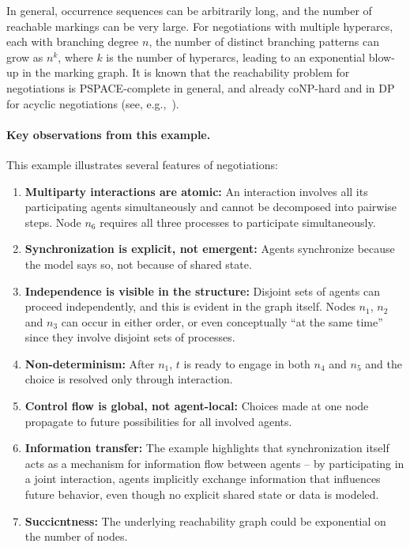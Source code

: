 In general, occurrence sequences can be arbitrarily long, and the number of reachable markings can be very large. For negotiations with multiple hyperarcs, each with branching degree \(n\), the number of distinct branching patterns can grow as \(n^k\), where \(k\) is the number of hyperarcs, leading to an exponential blow-up in the marking graph. It is known that the reachability problem for negotiations is PSPACE-complete in general, and already coNP-hard and in DP for acyclic negotiations (see, e.g.,~\cite{EsparzaDeselNegotiations}).

\paragraph{Key observations from this example.}
This example illustrates several features of negotiations:
\begin{enumerate}
\item \textbf{Multiparty interactions are atomic:} An interaction involves all its participating agents simultaneously and cannot be decomposed into pairwise steps. Node \(n_6\) requires all three processes to participate simultaneously.
\item \textbf{Synchronization is explicit, not emergent:} Agents synchronize because the model says so, not because of shared state.
\item \textbf{Independence is visible in the structure:} Disjoint sets of agents can proceed independently, and this is evident in the graph itself. Nodes \(n_1\), \(n_2\) and \(n_3\) can occur in either order, or even conceptually ``at the same time'' since they involve disjoint sets of processes.
\item \textbf{Non-determinism:} After \(n_1\), \(t\) is ready to engage in both \(n_4\) and \(n_5\) and the choice is resolved only through interaction.
\item \textbf{Control flow is global, not agent-local:} Choices made at one node propagate to future possibilities for all involved agents.
\item \textbf{Information transfer:} The example highlights that synchronization itself acts as a mechanism for
information flow between agents -- by participating in a joint interaction, agents
implicitly exchange information that influences future behavior, even though no
explicit shared state or data is modeled.
\item \textbf{Succicntness:} The underlying reachability graph could be exponential on the number of nodes.
\end{enumerate}

